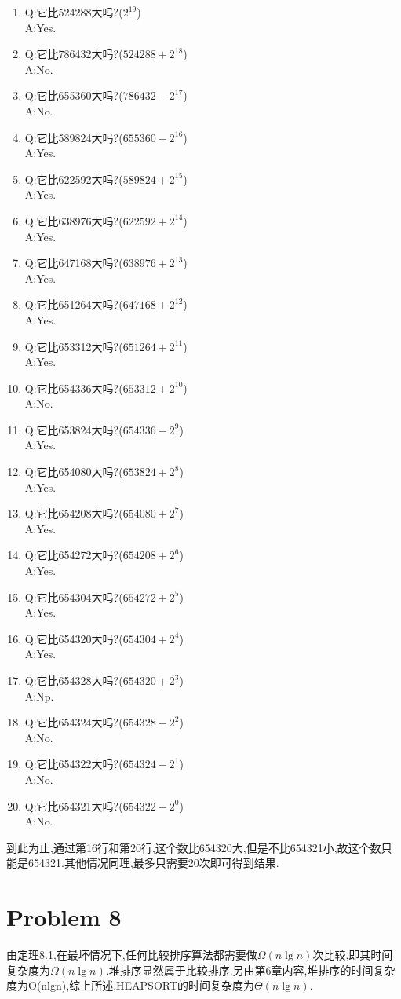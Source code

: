 \documentclass[12pt,a4paper,fontset=none]{ctexart}
\begin{document}
\begin{enumerate}
    \item Q:它比524288大吗?($2^{19}$)\\A:Yes.
    \item Q:它比786432大吗?($524288+2^{18}$)\\A:No.
    \item Q:它比655360大吗?($786432-2^{17}$)\\A:No.
    \item Q:它比589824大吗?($655360-2^{16}$)\\A:Yes.
    \item Q:它比622592大吗?($589824+2^{15}$)\\A:Yes.
    \item Q:它比638976大吗?($622592+2^{14}$)\\A:Yes.
    \item Q:它比647168大吗?($638976+2^{13}$)\\A:Yes.
    \item Q:它比651264大吗?($647168+2^{12}$)\\A:Yes.
    \item Q:它比653312大吗?($651264+2^{11}$)\\A:Yes.
    \item Q:它比654336大吗?($653312+2^{10}$)\\A:No.
    \item Q:它比653824大吗?($654336-2^9$)\\A:Yes.
    \item Q:它比654080大吗?($653824+2^8$)\\A:Yes.
    \item Q:它比654208大吗?($654080+2^7$)\\A:Yes.
    \item Q:它比654272大吗?($654208+2^6$)\\A:Yes.
    \item Q:它比654304大吗?($654272+2^5$)\\A:Yes.
    \item Q:它比654320大吗?($654304+2^4$)\\A:Yes.
    \item Q:它比654328大吗?($654320+2^3$)\\A:Np.
    \item Q:它比654324大吗?($654328-2^2$)\\A:No.
    \item Q:它比654322大吗?($654324-2^1$)\\A:No.
    \item Q:它比654321大吗?($654322-2^0$)\\A:No.
\end{enumerate}

到此为止,通过第16行和第20行,这个数比654320大,但是不比654321小,故这个数只能是654321.其他情况同理,最多只需要20次即可得到结果.
\section*{Problem 8}
由定理8.1,在最坏情况下,任何比较排序算法都需要做$\Omega(n\lg n)$次比较,即其时间复杂度为$\Omega(n\lg n)$.堆排序显然属于比较排序.另由第6章内容,堆排序的时间复杂度为O(nlgn),综上所述,HEAPSORT的时间复杂度为$\Theta(n\lg n)$.
\end{document}

